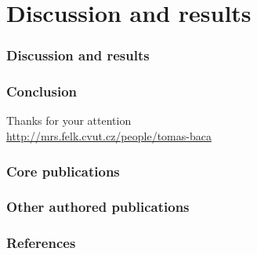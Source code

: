 \documentclass[aspectratio=169]{beamer}
\begin{document}

\section{Discussion and results}


\begin{frame}
\frametitle{Discussion and results}

\end{frame}



\begin{frame}
  \frametitle{Conclusion}

  \begin{center}
    \huge Thanks for your attention\\
    \vspace{1em}
    \large \url{http://mrs.felk.cvut.cz/people/tomas-baca}
  \end{center}

\end{frame}



\DeclareCiteCommand{\fullcite}
{}
{%
  \usedriver
  {%
  }
{}}
{\multicitedelim}
{}

\begin{frame}
  \frametitle{Core publications}
  \tiny{
    \printbibliography[keyword={mine},keyword={phd_related},keyword={core},heading=none,title={}]
  }
\end{frame}

\begin{frame}[allowframebreaks]
  \frametitle{Other authored publications}
  \tiny{
    \printbibliography[keyword={mine},notkeyword={core},heading=none,title={}]
  }
\end{frame}

\begin{frame}[allowframebreaks]
  \frametitle{References}
  \tiny{
    \printbibliography[notkeyword={mine},notkeyword={core},heading=none,title={}]
  }
\end{frame}


\end{document}
